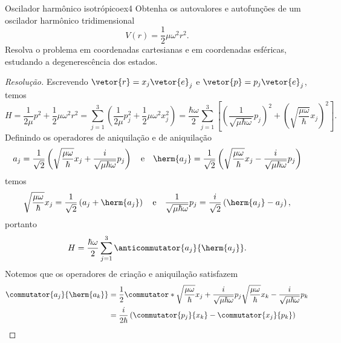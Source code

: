 \begin{exercício}{Oscilador harmônico isotrópico}{ex4}
    Obtenha os autovalores e autofunções de um oscilador harmônico tridimensional
    \begin{equation*}
        V(r) = \frac12 \mu \omega^2 r^2. 
    \end{equation*}
    Resolva o problema em coordenadas cartesianas e em coordenadas esféricas, estudando a degenerescência dos estados.
\end{exercício}
\begin{proof}[Resolução]
    Escrevendo \(\vetor{r} = x_j \vetor{e}_j\) e \(\vetor{p} = p_j \vetor{e}_j\), temos
    \begin{equation*}
        H = \frac1{2\mu} p^2 + \frac12 \mu \omega^2 r^2 = \sum_{j= 1}^3\left(\frac1{2\mu} p_j^2 + \frac12 \mu \omega^2 x_j^2\right) = \frac{\hbar \omega}{2} \sum_{j= 1}^3 \left[\left(\frac1{\sqrt{\mu  \hbar\omega}}p_j\right)^2 + \left(\sqrt{\frac{\mu \omega}{\hbar}}x_j\right)^2\right].
    \end{equation*}
    Definindo os operadores de aniquilação e de aniquilação
    \begin{equation*}
        a_j = \frac{1}{\sqrt{2}}\left(\sqrt{\frac{\mu\omega}{\hbar}}x_j + \frac{i}{\sqrt{\mu \hbar \omega}}p_j\right)
        \quad\text{e}\quad
        \herm{a_j} = \frac{1}{\sqrt{2}}\left(\sqrt{\frac{\mu\omega}{\hbar}}x_j - \frac{i}{\sqrt{\mu \hbar \omega}}p_j\right)
    \end{equation*}
    temos
    \begin{equation*}
        \sqrt{\frac{\mu\omega}\hbar}x_j = \frac1{\sqrt{2}}\left(a_j + \herm{a_j}\right) \quad\text{e}\quad \frac{1}{\sqrt{\mu \hbar \omega}} p_j = \frac{i}{\sqrt{2}}\left(\herm{a_j} - a_j\right),
    \end{equation*}
    portanto
    \begin{equation*}
        H = \frac{\hbar \omega}{2} \sum_{j=1}^3 \anticommutator{a_j}{\herm{a_j}}.
    \end{equation*}
    Notemos que os operadores de criação e aniquilação satisfazem
    \begin{align*}
        \commutator{a_j}{\herm{a_k}} &= \frac12\commutator*{\sqrt{\frac{\mu\omega}{\hbar}}x_j + \frac{i}{\sqrt{\mu \hbar \omega}}p_j}{\sqrt{\frac{\mu\omega}{\hbar}}x_k - \frac{i}{\sqrt{\mu \hbar \omega}}p_k}\\
                                     &= \frac{i}{2\hbar} \left(\commutator{p_j}{x_k} - \commutator{x_j}{p_k}\right)\\

\end{align*}
\end{proof}
